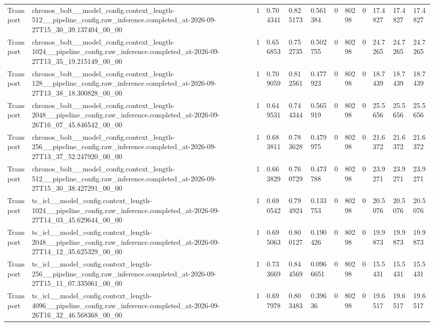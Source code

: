 \begin{tabular}{llllllllllll}
Transport & chronos\_bolt\_\_model\_config.context\_length-512\_\_pipeline\_config.raw\_inference.completed\_at-2026-09-27T15\_30\_39.137404\_00\_00 & 1 & 0.704341 & 0.825173 & 0.561384 & 0 & 80298 & 0 & 17.4827 & 17.4827 & 17.4827 \\
Transport & chronos\_bolt\_\_model\_config.context\_length-1024\_\_pipeline\_config.raw\_inference.completed\_at-2026-09-27T13\_35\_19.215149\_00\_00 & 1 & 0.656853 & 0.752735 & 0.502755 & 0 & 80298 & 0 & 24.7265 & 24.7265 & 24.7265 \\
Transport & chronos\_bolt\_\_model\_config.context\_length-128\_\_pipeline\_config.raw\_inference.completed\_at-2026-09-27T13\_38\_18.300828\_00\_00 & 1 & 0.709059 & 0.812561 & 0.477923 & 0 & 80298 & 0 & 18.7439 & 18.7439 & 18.7439 \\
Transport & chronos\_bolt\_\_model\_config.context\_length-2048\_\_pipeline\_config.raw\_inference.completed\_at-2026-09-26T16\_07\_45.846542\_00\_00 & 1 & 0.649531 & 0.744344 & 0.565919 & 0 & 80298 & 0 & 25.5656 & 25.5656 & 25.5656 \\
Transport & chronos\_bolt\_\_model\_config.context\_length-256\_\_pipeline\_config.raw\_inference.completed\_at-2026-09-27T13\_37\_52.247920\_00\_00 & 1 & 0.683811 & 0.783628 & 0.479975 & 0 & 80298 & 0 & 21.6372 & 21.6372 & 21.6372 \\
Transport & chronos\_bolt\_\_model\_config.context\_length-512\_\_pipeline\_config.raw\_inference.completed\_at-2026-09-27T15\_30\_38.427291\_00\_00 & 1 & 0.663829 & 0.760729 & 0.473788 & 0 & 80298 & 0 & 23.9271 & 23.9271 & 23.9271 \\
Transport & ts\_icl\_\_model\_config.context\_length-1024\_\_pipeline\_config.raw\_inference.completed\_at-2026-09-27T14\_03\_45.629644\_00\_00 & 1 & 0.690542 & 0.794924 & 0.133753 & 0 & 80298 & 0 & 20.5076 & 20.5076 & 20.5076 \\
Transport & ts\_icl\_\_model\_config.context\_length-2048\_\_pipeline\_config.raw\_inference.completed\_at-2026-09-27T14\_12\_35.625329\_00\_00 & 1 & 0.695063 & 0.800127 & 0.190426 & 0 & 80298 & 0 & 19.9873 & 19.9873 & 19.9873 \\
Transport & ts\_icl\_\_model\_config.context\_length-256\_\_pipeline\_config.raw\_inference.completed\_at-2026-09-27T15\_11\_07.335061\_00\_00 & 1 & 0.733669 & 0.844569 & 0.0966651 & 0 & 80298 & 0 & 15.5431 & 15.5431 & 15.5431 \\
Transport & ts\_icl\_\_model\_config.context\_length-4096\_\_pipeline\_config.raw\_inference.completed\_at-2026-09-26T16\_32\_46.568368\_00\_00 & 1 & 0.697978 & 0.803483 & 0.39636 & 0 & 80298 & 0 & 19.6517 & 19.6517 & 19.6517 \\

\end{tabular}
